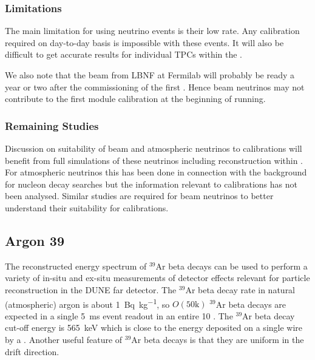 \subsubsection{Limitations}

The main limitation for using neutrino events is their low rate. Any calibration required on day-to-day basis is impossible with these events. It will also be difficult to get accurate results for individual TPCs within the . 

We also note that the beam from LBNF at Fermilab will probably be ready a year or two after the commissioning of the first . Hence beam neutrinos may not contribute to the first module calibration at the beginning of running.

\subsubsection{Remaining Studies}

Discussion on suitability of beam and atmospheric neutrinos to calibrations will benefit from full simulations of these neutrinos including reconstruction within . For atmospheric neutrinos this has been done in connection with the background for nucleon decay searches but the information relevant to calibrations has not been analysed. Similar studies are required for beam neutrinos to better understand their suitability for calibrations.

\subsection{Argon 39}
\label{sec:ar39}
The reconstructed energy spectrum of ${}^{39}$Ar beta decays can be used to perform a variety of in-situ and ex-situ measurements of detector effects relevant for particle reconstruction in the DUNE far detector. The ${}^{39}$Ar beta decay rate in natural (atmospheric) argon is about \SI{1}{\becquerel\per\kilo\gram}, so $O(\mathrm{50k})$ ${}^{39}$Ar beta decays are expected in a single \SI{5}{\milli\s} event readout in an entire \SI{10}{\kt} . The ${}^{39}$Ar beta decay cut-off energy is \SI{565}{\keV} which is close to the energy deposited on a single wire by a . Another useful feature of ${}^{39}$Ar beta decays is that they are uniform in the drift direction.

